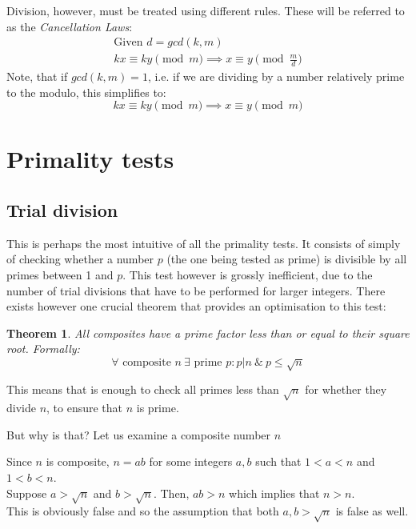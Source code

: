 \documentclass[12pt]{article}
\newtheorem{theorem}{Theorem}
\begin{document}
    Division, however, must be treated using different rules. These will be
    referred to as the \emph{Cancellation Laws}:
    \begin{gather*}
        \text{Given } d = gcd(k, m)\\
        kx \equiv ky \pmod{m} \implies x \equiv y \pmod{\frac{m}{d}}
    \end{gather*}
    Note, that if $gcd(k, m) = 1$, i.e. if we are dividing by a number
    relatively prime to the modulo, this simplifies to:
    \begin{equation*}
        kx \equiv ky \pmod{m} \implies x \equiv y \pmod{m}
    \end{equation*}


\section{Primality tests}
    \subsection{Trial division}

    This is perhaps the most intuitive of all the primality tests. It consists
    of simply of checking whether a number $p$ (the one being tested as prime)
    is divisible by all primes between 1 and $p$. This test however is grossly
    inefficient, due to the number of trial divisions that have to be performed
    for larger integers. There exists however one crucial theorem that provides
    an optimisation to this test:
    \begin{theorem} \label{th:prime_factors_less_than_root}
        All composites have a prime factor less than or equal to their square
        root. Formally:\\
        $$\forall \text{ composite } n \: \exists \text{ prime } p:p|n \: \& \: p \leq \sqrt{n}$$
    \end{theorem}
    This means that is enough to check all primes less than $\sqrt{n}$ for
    whether they divide $n$, to ensure that $n$ is prime. 
    
    But why is that? Let us examine a composite number $n$

    Since $n$ is composite, $n=ab$ for some integers $a, b$ such that $1<a<n$
    and $1<b<n$.\\
    Suppose $a>\sqrt{n}$ and $b>\sqrt{n}$. Then, $ab>n$ which implies that
    $n>n$. \\
    This is obviously false and so the assumption that both $a,b > \sqrt{n}$
    is false as well.
\end{document}
